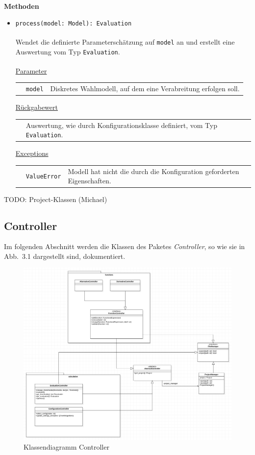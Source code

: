 \documentclass{article}
\begin{document}
\textbf{{Methoden}}
\begin{itemize}\setlength\itemsep{3em}
\item \texttt{process(model: Model): Evaluation}\\\\
Wendet die definierte Parameterschätzung auf \texttt{model} an und erstellt eine Auswertung vom Typ \texttt{Evaluation}.
\\\\
\underline{{Parameter}}\\
\begin{tabular}{lll}
 & \texttt{model} & Diskretes Wahlmodell, auf dem eine Verabreitung erfolgen soll.\\
\end{tabular}

\underline{{Rückgabewert}}\\
\begin{tabular}{lll}
 & Auswertung, wie durch Konfigurationsklasse definiert, vom Typ \texttt{Evaluation}.\\
\end{tabular}

\underline{{Exceptions}}\\
\begin{tabular}{lll}
 & \texttt{ValueError} & Modell hat nicht die durch die Konfiguration geforderten Eigenschaften.\\
\end{tabular}
\end{itemize}

\newpage
TODO: Project-Klassen (Michael)

\subsection{Controller}

Im folgenden Abschnitt werden die Klassen des Paketes \emph{Controller}, so wie sie in Abb.~3.1 dargestellt sind, dokumentiert.

\begin{figure}[H]%
    \centering
    \includegraphics[width=13cm]{entwurf/Entwurf_dokument/img/Floriane/ControllerklassendiagrammTemporaer.png}
    \caption{Klassendiagramm Controller}
\end{figure}
\end{document}
